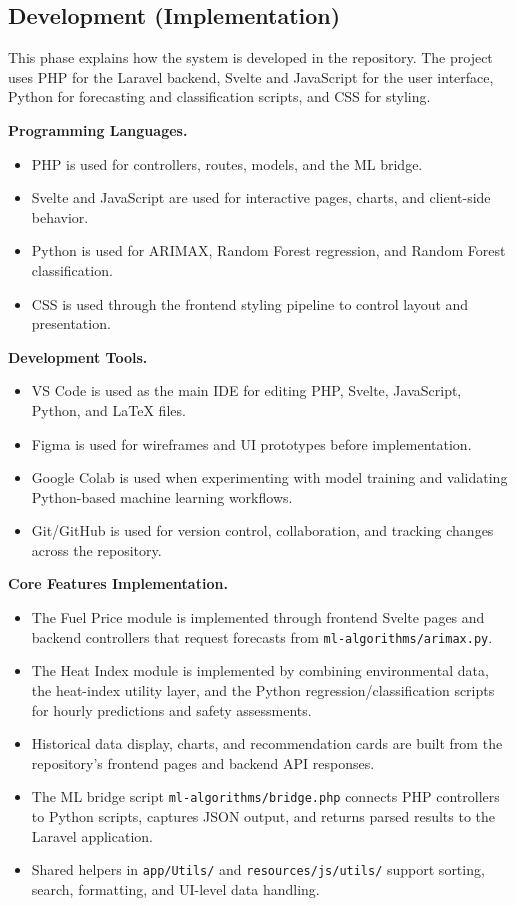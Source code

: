 \documentclass[12pt]{article}
\begin{document}
\subsection{Development (Implementation)}

This phase explains how the system is developed in the repository. The project uses PHP for the Laravel backend, Svelte and JavaScript for the user interface, Python for forecasting and classification scripts, and CSS for styling.

\medskip
\noindent\textbf{Programming Languages.}
\begin{itemize}
    \item PHP is used for controllers, routes, models, and the ML bridge.
    \item Svelte and JavaScript are used for interactive pages, charts, and client-side behavior.
    \item Python is used for ARIMAX, Random Forest regression, and Random Forest classification.
    \item CSS is used through the frontend styling pipeline to control layout and presentation.
\end{itemize}

\medskip
\noindent\textbf{Development Tools.}
\begin{itemize}
    \item VS Code is used as the main IDE for editing PHP, Svelte, JavaScript, Python, and LaTeX files.
    \item Figma is used for wireframes and UI prototypes before implementation.
    \item Google Colab is used when experimenting with model training and validating Python-based machine learning workflows.
    \item Git/GitHub is used for version control, collaboration, and tracking changes across the repository.
\end{itemize}

\medskip
\noindent\textbf{Core Features Implementation.}
\begin{itemize}
    \item The Fuel Price module is implemented through frontend Svelte pages and backend controllers that request forecasts from \texttt{ml-algorithms/arimax.py}.
    \item The Heat Index module is implemented by combining environmental data, the heat-index utility layer, and the Python regression/classification scripts for hourly predictions and safety assessments.
    \item Historical data display, charts, and recommendation cards are built from the repository's frontend pages and backend API responses.
    \item The ML bridge script \texttt{ml-algorithms/bridge.php} connects PHP controllers to Python scripts, captures JSON output, and returns parsed results to the Laravel application.
    \item Shared helpers in \texttt{app/Utils/} and \texttt{resources/js/utils/} support sorting, search, formatting, and UI-level data handling.
\end{itemize}
\end{document}
